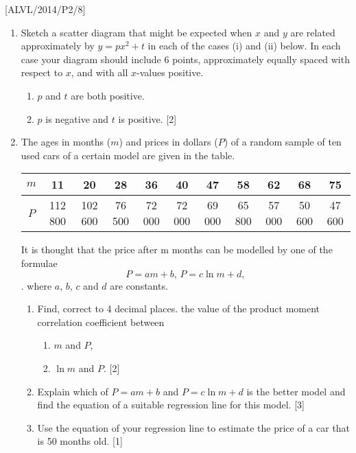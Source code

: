 \item {[}ALVL/2014/P2/8{]}
\begin{enumerate}
\item Sketch a scatter diagram that might be expected when $x$ and $y$
are related approximately by $y=px^{2}+t$ in each of the cases (i)
and (ii) below. In each case your diagram should include 6 points,
approximately equally spaced with respect to $x$, and with all $x$-values
positive. 
\begin{enumerate}
\item $p$ and $t$ are both positive. 
\item $p$ is negative and $t$ is positive. {[}2{]} 
\end{enumerate}
\item The ages in months ($m$) and prices in dollars ($P$) of a random
sample of ten used cars of a certain model are given in the table. 
\noindent \begin{center}
\begin{tabular}{|c|c|c|c|c|c|c|c|c|c|c|}
\hline 
$m$ & 11 & 20 & 28 & 36 & 40 & 47 & 58 & 62 & 68 & 75\tabularnewline
\hline 
$P$ & 112 800 & 102 600 & 76 500 & 72 000 & 72 000 & 69 000 & 65 800 & 57 000 & 50 600 & 47 600\tabularnewline
\hline 
\end{tabular}
\par\end{center}

It is thought that the price after m months can be modelled by one
of the formulae 
\[
P=am+b,\,P=c\ln m+d,
\]
. where $a$, $b$, $c$ and $d$ are constants. 
\begin{enumerate}
\item Find, correct to 4 decimal places. the value of the product moment
correlation coefficient between 
\begin{enumerate}
\item $m$ and $P$, 
\item $\ln m$ and $P$. \hfill{}{[}2{]}
\end{enumerate}
\item Explain which of $P=am+b$ and $P=c\ln m+d$ is the better model and
find the equation of a suitable regression line for this model. \hfill{}{[}3{]}
\item Use the equation of your regression line to estimate the price of
a car that is 50 months old. \hfill{}{[}1{]}
\end{enumerate}
\end{enumerate}
